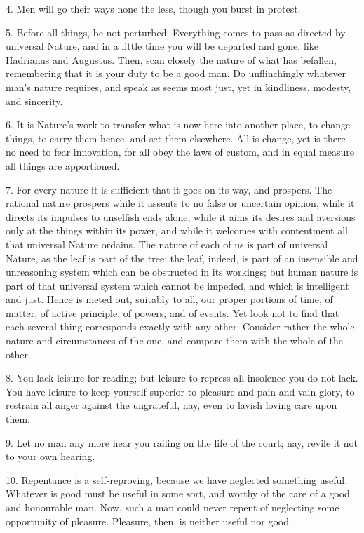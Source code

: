 \documentclass{book}
\begin{document}
4. Men will go their ways none the less, though you burst in protest.

5. Before all things, be not perturbed. Everything comes to pass as
directed by universal Nature, and in a little time you will be
departed and gone, like Hadrianus and Augustus. Then, scan closely the
nature of what has befallen, remembering that it is your duty to be a
good man. Do unflinchingly whatever man's nature requires, and speak
as seems most just, yet in kindliness, modesty, and sincerity.

6. It is Nature's work to transfer what is now here into another
place, to change things, to carry them hence, and set them
elsewhere. All is change, yet is there no need to fear innovation, for
all obey the laws of custom, and in equal measure all things are
apportioned.

7. For every nature it is sufficient that it goes on its way, and
prospers. The rational nature prospers while it assents to no false or
uncertain opinion, while it directs its impulses to unselfish ends
alone, while it aims its desires and aversions only at the things
within its power, and while it welcomes with contentment all that
universal Nature ordains. The nature of each of us is part of
universal Nature, as the leaf is part of the tree; the leaf, indeed,
is part of an insensible and unreasoning system which can be
obstructed in its workings; but human nature is part of that universal
system which cannot be impeded, and which is intelligent and
just. Hence is meted out, suitably to all, our proper portions of
time, of matter, of active principle, of powers, and of events. Yet
look not to find that each several thing corresponds exactly with any
other. Consider rather the whole nature and circumstances of the one,
and compare them with the whole of the other.

8. You lack leisure for reading; but leisure to repress all insolence
you do not lack. You have leisure to keep yourself superior to
pleasure and pain and vain glory, to restrain all anger against the
ungrateful, nay, even to lavish loving care upon them.

9. Let no man any more hear you railing on the life of the court; nay,
revile it not to your own hearing.

10. Repentance is a self-reproving, because we have neglected
something useful. Whatever is good must be useful in some sort, and
worthy of the care of a good and honourable man. Now, such a man could
never repent of neglecting some opportunity of pleasure. Pleasure,
then, is neither useful nor good.
\end{document}
